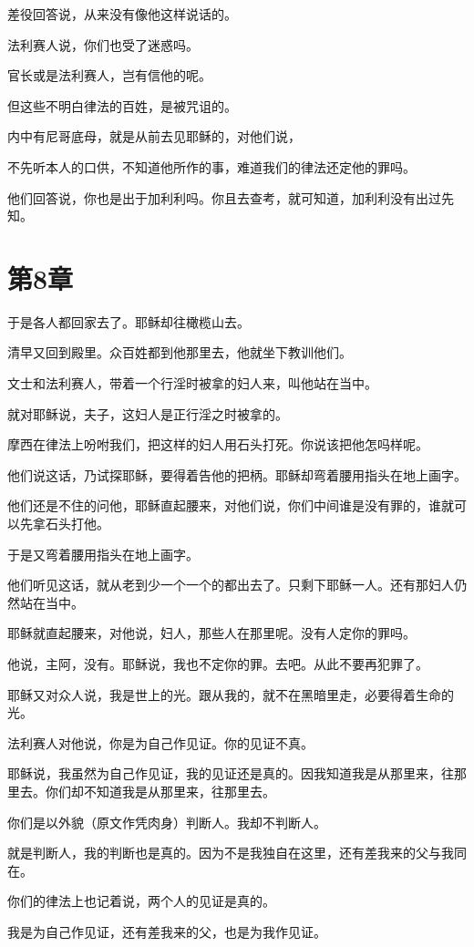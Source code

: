 \documentclass[12pt,oneside]{book}
\begin{document}
差役回答说，从来没有像他这样说话的。

法利赛人说，你们也受了迷惑吗。

官长或是法利赛人，岂有信他的呢。

但这些不明白律法的百姓，是被咒诅的。

内中有尼哥底母，就是从前去见耶稣的，对他们说，

不先听本人的口供，不知道他所作的事，难道我们的律法还定他的罪吗。

他们回答说，你也是出于加利利吗。你且去查考，就可知道，加利利没有出过先知。

\chapter{第8章}
于是各人都回家去了。耶稣却往橄榄山去。

清早又回到殿里。众百姓都到他那里去，他就坐下教训他们。

文士和法利赛人，带着一个行淫时被拿的妇人来，叫他站在当中。

就对耶稣说，夫子，这妇人是正行淫之时被拿的。

摩西在律法上吩咐我们，把这样的妇人用石头打死。你说该把他怎吗样呢。

他们说这话，乃试探耶稣，要得着告他的把柄。耶稣却弯着腰用指头在地上画字。

他们还是不住的问他，耶稣直起腰来，对他们说，你们中间谁是没有罪的，谁就可以先拿石头打他。

于是又弯着腰用指头在地上画字。

他们听见这话，就从老到少一个一个的都出去了。只剩下耶稣一人。还有那妇人仍然站在当中。

耶稣就直起腰来，对他说，妇人，那些人在那里呢。没有人定你的罪吗。

他说，主阿，没有。耶稣说，我也不定你的罪。去吧。从此不要再犯罪了。

耶稣又对众人说，我是世上的光。跟从我的，就不在黑暗里走，必要得着生命的光。

法利赛人对他说，你是为自己作见证。你的见证不真。

耶稣说，我虽然为自己作见证，我的见证还是真的。因我知道我是从那里来，往那里去。你们却不知道我是从那里来，往那里去。

你们是以外貌（原文作凭肉身）判断人。我却不判断人。

就是判断人，我的判断也是真的。因为不是我独自在这里，还有差我来的父与我同在。

你们的律法上也记着说，两个人的见证是真的。

我是为自己作见证，还有差我来的父，也是为我作见证。
\end{document}
